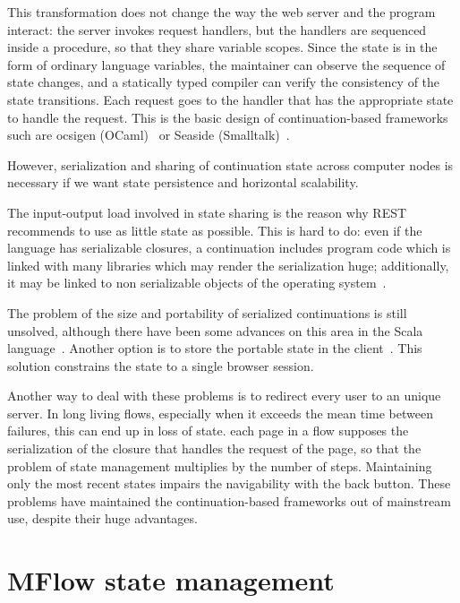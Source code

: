 \documentclass{tmr}
\begin{document}
This transformation does not change the way the web server and the program interact: the server invokes request handlers, but  the handlers are sequenced inside a procedure, so that they share variable scopes. Since the state is in the form of ordinary language variables, the maintainer can observe the sequence of state changes, and a statically typed compiler can verify the consistency of the state transitions. Each request goes to the handler that has the appropriate state to handle the request. This is the basic design of continuation-based frameworks such are ocsigen (OCaml)~\cite{auth:ocsigen} or Seaside (Smalltalk)~\cite{auth:seaside}. 
 
However, serialization  and sharing of continuation state across computer nodes is necessary if we want state persistence and horizontal scalability. 

The input-output load involved in state sharing is the reason why REST recommends to use as little state as possible. This is hard to do: even if the language has serializable closures, a continuation includes program code which is linked with many libraries which may render the serialization huge; additionally, it may be linked to non serializable objects of the operating system~\cite{oleg}. 

The problem of the size and portability of serialized continuations is still unsolved, although there have been some advances on this area in the Scala language~\cite{swarm}. Another option is to store the portable state in the client~\cite{McCarthy:2009:ARW:1631687.1596594}. This solution constrains the state to a single browser session. 
 
Another way to deal with these problems is to redirect every user to an unique server. In long living flows, especially when it exceeds the mean time between failures, this can end up in loss of state. each page in a flow supposes the serialization of the closure that handles the request of the page, so that the problem of state management multiplies by the number of steps. Maintaining only the most recent states impairs the navigability with the back button. These problems have maintained the continuation-based frameworks out of  mainstream use, despite their huge advantages. 
 
 
\section{ MFlow state management} 
 
\end{document}
